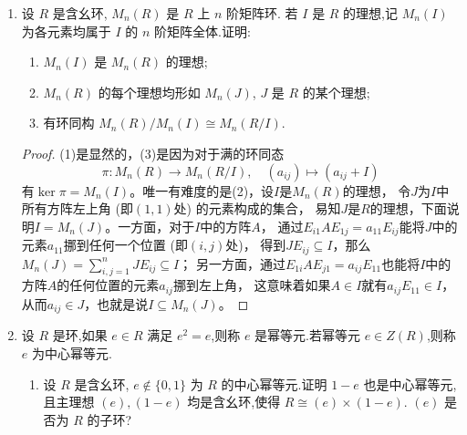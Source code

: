 \begin{enumerate}
\begin{proof}
    设$\gamma=a'+b'\sqrt{-1},\delta=c'+d'\sqrt{-1}$，那么
    \begin{align*}
        \alpha\gamma-\beta\bar{\delta}
        &=\big(a+b\sqrt{-1}\big)\big(a'+b'\sqrt{-1}\big)
        -\big(c+d\sqrt{-1}\big)\big(c'-d'\sqrt{-1}\big)\\
        &=(aa'-bb'-cc'+dd')+(ab'+a'b+cd'-c'd)\sqrt{-1},\\
        \alpha\delta+\beta\bar{\gamma}
        &=\big(a+b\sqrt{-1}\big)\big(c'+d'\sqrt{-1}\big)
        +\big(a'-b'\sqrt{-1}\big)\big(c+d\sqrt{-1}\big)\\
        &=(ac'+a'c+b'd-bd')+(ad'+a'd+bc'-b'c)\sqrt{-1},
    \end{align*}
    同2.2节例3中的表达式比对一下即可。
\end{proof}
\item 设 $ R $ 是含幺环, $ M_n(R) $ 是 $ R $ 上 $ n $ 阶矩阵环.
若 $ I $ 是 $ R $ 的理想,记 $ M_n(I) $ 为各元素均属于 $ I $ 的 $ n $ 阶矩阵全体.证明:
\begin{enumerate}[label=(\arabic*)]
    \item $ M_n(I) $ 是 $ M_n(R) $ 的理想;
    \item $ M_n(R) $ 的每个理想均形如 $ M_n(J) $, $ J $ 是 $ R $ 的某个理想;
    \item 有环同构 $ M_n(R)/M_n(I) \cong M_n(R/I) $.
\end{enumerate}
\begin{proof}
    (1)是显然的，(3)是因为对于满的环同态
    \[\pi:M_n(R) \to M_n(R/I),\quad(a_{ij})\mapsto(a_{ij}+I)\]
    有$\ker\pi=M_n(I)$。唯一有难度的是(2)，设$I$是$M_n(R)$的理想，
    令$J$为$I$中所有方阵左上角 (即$(1,1)$处) 的元素构成的集合，
    易知$J$是$R$的理想，下面说明$I=M_n(J)$。一方面，对于$I$中的方阵$A$，
    通过$E_{i1}AE_{1j}=a_{11}E_{ij}$能将$J$中的元素$a_{11}$挪到任何一个位置 (即$(i,j)$处)，
    得到$JE_{ij} \subseteq I$，那么$M_n(J)=\sum\limits_{i,j=1}^{n}JE_{ij} \subseteq I$；
    另一方面，通过$E_{1i}AE_{j1}=a_{ij}E_{11}$也能将$I$中的方阵$A$的任何位置的元素$a_{ij}$挪到左上角，
    这意味着如果$A \in I$就有$a_{ij}E_{11} \in I$，从而$a_{ij} \in J$，也就是说$I \subseteq M_n(J)$。
\end{proof}
\item 设 $ R $ 是环,如果 $ e \in R $ 满足 $ e^2 = e $,则称 $ e $ 是幂等元.若幂等元 $ e \in Z(R) $,则称 $ e $ 为中心幂等元.
\begin{enumerate}[label=(\arabic*)]
    \item 设 $ R $ 是含幺环, $ e \notin \{0,1\} $ 为 $ R $ 的中心幂等元.证明 $ 1-e $ 也是中心幂等元,且主理想 $(e), (1-e)$ 均是含幺环,使得 $ R \cong (e) \times (1-e) $. $ (e) $ 是否为 $ R $ 的子环?

\end{enumerate}
\end{enumerate}
